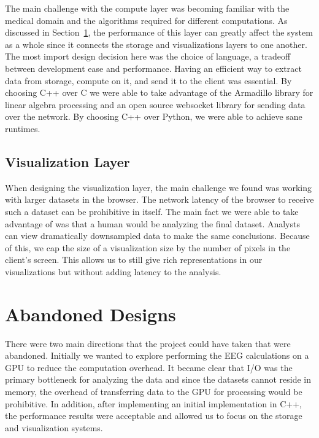 The main challenge with the compute layer was becoming familiar with the
medical domain and the algorithms required for different computations. As
discussed in Section~\ref{discuss-ch:abandon}, the performance of this layer
can greatly affect the system as a whole since it connects the storage and
visualizations layers to one another. The most import design decision here was
the choice of language, a tradeoff between development ease and performance.
Having an efficient way to extract data from storage, compute on it, and send
it to the client was essential. By choosing C++ over C we were able to take
advantage of the Armadillo \cite{arma} library for linear algebra processing
and an open source websocket library \cite{websocket-server} for sending data
over the network. By choosing C++ over Python, we were able to achieve
sane runtimes.

\subsection{Visualization Layer}

When designing the visualization layer, the main challenge we found was working
with larger datasets in the browser. The network latency of the browser to
receive such a dataset can be prohibitive in itself. The main fact we were able
to take advantage of was that a human would be analyzing the final dataset.
Analysts can view dramatically downsampled data to make the same conclusions.
Because of this, we cap the size of a visualization size by the number of
pixels in the client's screen. This allows us to still give rich
representations in our visualizations but without adding latency to the
analysis.

\section{Abandoned Designs}\label{discuss-ch:abandon}

There were two main directions that the project could have taken that were
abandoned. Initially we wanted to explore performing the EEG calculations on a
GPU to reduce the computation overhead. It became clear that I/O was the
primary bottleneck for analyzing the data and since the datasets cannot reside
in memory, the overhead of transferring data to the GPU for processing would be
prohibitive. In addition, after implementing an initial implementation in C++,
the performance results were acceptable and allowed us to focus on the storage
and visualization systems. \\

